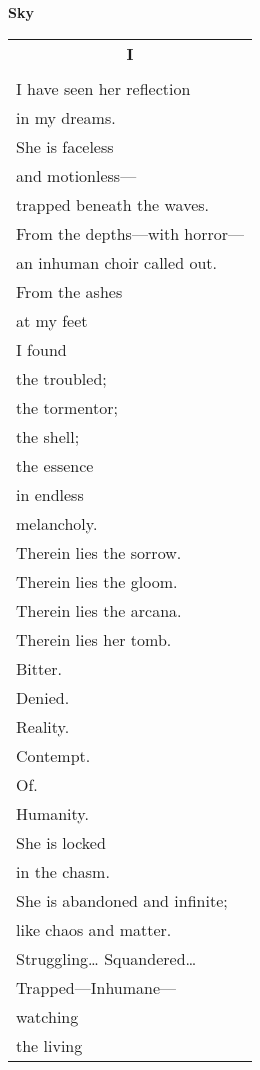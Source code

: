 \documentclass{article}
\begin{document}
\newcommand{\h}{\hspace*{2ex}}
\newcommand{\HHHH}{\hspace*{32ex}}
\begin{center}
{\large\textbf{Sky}} \\
\begin{tabular}{l}
\multicolumn{1}{c}{\large\textbf{I}} \\
\\
I have seen her reflection \\
\h in my dreams. \\
She is faceless \\
\h and motionless--- \\
\h\h trapped beneath the waves. \\ %
From the depths---with horror--- \\
\h an inhuman choir called out. \\ %
From the ashes \\
\h at my feet \\
\h\h I found \\
the troubled; \\
\h the tormentor; \\
\h\h the shell; \\
\h\h\h the essence \\ %
in endless \\
\h melancholy. \\
Therein lies the sorrow. \\
Therein lies the gloom. \\
Therein lies the arcana. \\
Therein lies her tomb. \\
\h Bitter. \\
\h\h Denied. \\
\h\h\h Reality. \\
\h Contempt. \\
\h\h Of. \\
\h\h\h Humanity. \\
She is locked \\
\h in the chasm. \\
She is abandoned and infinite; \\
\h like chaos and matter. \\ %
Struggling\ldots{} Squandered\ldots \\
\h Trapped---Inhumane--- \\
\h\h watching \\
\h\h\h the living \\

\end{tabular}
\end{center}
\end{document}
